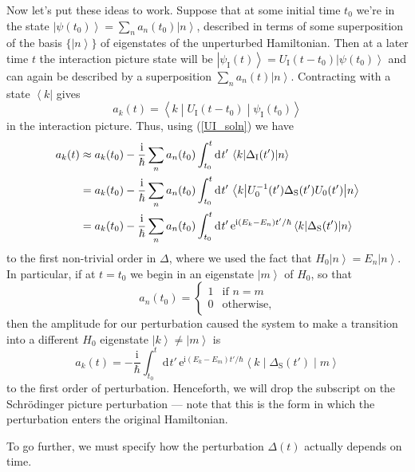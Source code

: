 \documentclass{article}
\theoremstyle{plain}\theoremheaderfont{\normalfont\itshape}\theorembodyfont{\rmfamily}\theoremseparator{.}\newtheorem*{rem}{Remark}\newtheorem*{ex}{Example}\newtheorem*{proof}{Proof}\newtheorem*{altp}{Alternative proof}
\theoremstyle{plain}\theoremheaderfont{\normalfont\bfseries}\theorembodyfont{\rmfamily}\theoremseparator{.}\newtheorem{thm}{Theorem}[section]\newtheorem{lem}[thm]{Lemma}\newtheorem{prop}[thm]{Proposition}\newtheorem*{cor}{Corollary}\newtheorem{defn}[thm]{Definition}\newtheorem{clm}[thm]{Claim}\newtheorem{clminproof}{Claim}
\theoremstyle{break}\theoremheaderfont{\normalfont\itshape}\theorembodyfont{\rmfamily}\theoremseparator{.\medskip}\newtheorem*{proofskip}{Proof}\newtheorem*{exs}{Examples}\newtheorem*{rems}{Remarks}
\theoremstyle{break}\theoremheaderfont{\normalfont\bfseries}\theorembodyfont{\rmfamily}\theoremseparator{.\medskip}\newtheorem{lemskip}[thm]{Lemma}\newtheorem{defnskip}[thm]{Definition}\newtheorem{propskip}[thm]{Proposition}\newtheorem{thmskip}[thm]{Theorem}
\numberwithin{equation}{section}
\newcommand{\ii}{\mathrm{i}}
\newcommand{\ee}{\mathrm{e}}
\newcommand{\dd}[2][]{\mathrm{d}^{#1} #2\,}
\newcommand{\bra}[1]{\left\langle #1 \right|}
\newcommand{\ket}[1]{\left| #1 \right\rangle}
\newcommand{\mel}[3]{\left\langle #1 \middle| #2 \middle| #3 \right\rangle}
\renewcommand{\S}{_{\mathrm{S}}}
\newcommand{\I}{_{\mathrm{I}}}
\begin{document}
    Now let's put these ideas to work. Suppose that at some initial time \(t_0\) we're in the state \(\ket{\psi(t_0)}=\sum_n a_n(t_0)\ket{n}\), described in terms of some superposition of the basis \(\{\ket{n}\}\) of eigenstates of the unperturbed Hamiltonian. Then at a later time \(t\) the interaction picture state will be \(\ket{\psi\I(t)}=U\I (t-t_0)\ket{\psi(t_0)}\) and can again be described by a superposition \(\sum_n a_n(t)\ket{n}\). Contracting with a state \(\bra{k}\) gives
    \begin{equation}
        a_k(t)=\mel{k}{U\I(t-t_0)}{\psi\I(t_0)}
    \end{equation}
    in the interaction picture. Thus, using (\ref{UI_soln}) we have
    \begin{align}
        a_k(t)&\approx a_k(t_0)-\frac{\ii}{\hbar}\sum_n a_n(t_0)\int_{t_0}^{t}\dd{t'}\mel{k}{\Delta\I(t')}{n}\notag\\
        &=a_k(t_0)-\frac{\ii}{\hbar}\sum_n a_n(t_0)\int_{t_0}^{t}\dd{t'}\mel{k}{U_0^{-1}(t')\Delta\S(t')U_0(t')}{n}\notag\\
        &=a_k(t_0)-\frac{\ii}{\hbar}\sum_n a_n(t_0)\int_{t_0}^{t}\dd{t'}\ee^{\ii (E_k-E_n)t'/\hbar}\mel{k}{\Delta\S (t')}{n}
    \end{align}
    to the first non-trivial order in \(\Delta\), where we used the fact that \(H_0\ket{n}=E_n\ket{n}\). In particular, if at \(t=t_0\) we begin in an eigenstate \(\ket{m}\) of \(H_0\), so that
    \begin{equation}
        a_n(t_0)=\begin{cases}
            1 & \text{if }n=m\\
            0 & \text{otherwise,}
        \end{cases}
    \end{equation}
    then the amplitude for our perturbation caused the system to make a transition into a different \(H_0\) eigenstate \(\ket{k}\ne\ket{m}\) is
    \begin{equation}\label{TDPT_transition_amplitude}
        a_k(t)=-\frac{\ii}{\hbar}\int_{t_0}^{t}\dd{t'}\ee^{\ii (E_k-E_m)t'/\hbar}\mel{k}{\Delta\S(t')}{m}
    \end{equation}
    to the first order of perturbation. Henceforth, we will drop the subscript on the Schr\"{o}dinger picture perturbation --- note that this is the form in which the perturbation enters the original Hamiltonian.
    
    To go further, we must specify how the perturbation \(\Delta(t)\) actually depends on time.
\end{document}
